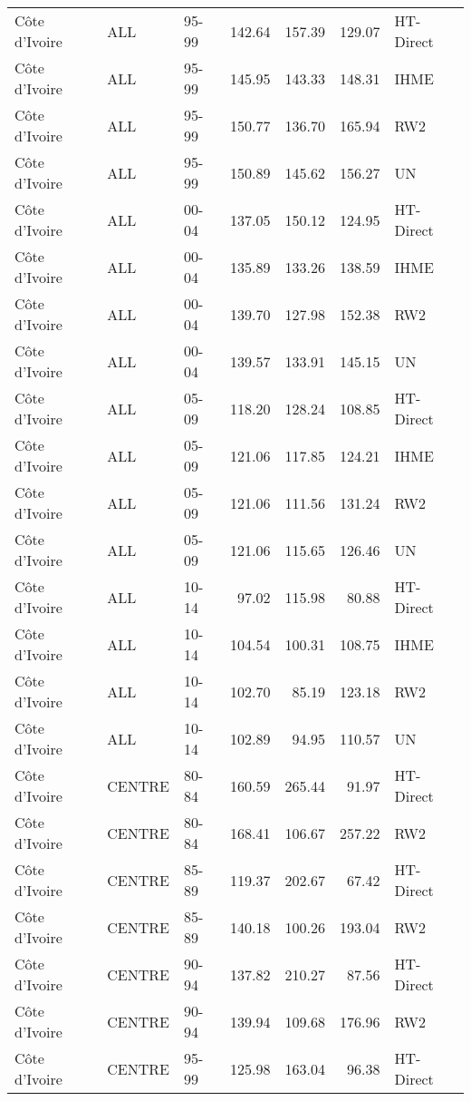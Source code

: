 \begin{longtable}{lllrrrl}
  C\^{o}te d'Ivoire & ALL & 95-99 & 142.64 & 157.39 & 129.07 & HT-Direct \\ 
  C\^{o}te d'Ivoire & ALL & 95-99 & 145.95 & 143.33 & 148.31 & IHME \\ 
  C\^{o}te d'Ivoire & ALL & 95-99 & 150.77 & 136.70 & 165.94 & RW2 \\ 
  C\^{o}te d'Ivoire & ALL & 95-99 & 150.89 & 145.62 & 156.27 & UN \\ 
  C\^{o}te d'Ivoire & ALL & 00-04 & 137.05 & 150.12 & 124.95 & HT-Direct \\ 
  C\^{o}te d'Ivoire & ALL & 00-04 & 135.89 & 133.26 & 138.59 & IHME \\ 
  C\^{o}te d'Ivoire & ALL & 00-04 & 139.70 & 127.98 & 152.38 & RW2 \\ 
  C\^{o}te d'Ivoire & ALL & 00-04 & 139.57 & 133.91 & 145.15 & UN \\ 
  C\^{o}te d'Ivoire & ALL & 05-09 & 118.20 & 128.24 & 108.85 & HT-Direct \\ 
  C\^{o}te d'Ivoire & ALL & 05-09 & 121.06 & 117.85 & 124.21 & IHME \\ 
  C\^{o}te d'Ivoire & ALL & 05-09 & 121.06 & 111.56 & 131.24 & RW2 \\ 
  C\^{o}te d'Ivoire & ALL & 05-09 & 121.06 & 115.65 & 126.46 & UN \\ 
  C\^{o}te d'Ivoire & ALL & 10-14 & 97.02 & 115.98 & 80.88 & HT-Direct \\ 
  C\^{o}te d'Ivoire & ALL & 10-14 & 104.54 & 100.31 & 108.75 & IHME \\ 
  C\^{o}te d'Ivoire & ALL & 10-14 & 102.70 & 85.19 & 123.18 & RW2 \\ 
  C\^{o}te d'Ivoire & ALL & 10-14 & 102.89 & 94.95 & 110.57 & UN \\ 
  C\^{o}te d'Ivoire & CENTRE & 80-84 & 160.59 & 265.44 & 91.97 & HT-Direct \\ 
  C\^{o}te d'Ivoire & CENTRE & 80-84 & 168.41 & 106.67 & 257.22 & RW2 \\ 
  C\^{o}te d'Ivoire & CENTRE & 85-89 & 119.37 & 202.67 & 67.42 & HT-Direct \\ 
  C\^{o}te d'Ivoire & CENTRE & 85-89 & 140.18 & 100.26 & 193.04 & RW2 \\ 
  C\^{o}te d'Ivoire & CENTRE & 90-94 & 137.82 & 210.27 & 87.56 & HT-Direct \\ 
  C\^{o}te d'Ivoire & CENTRE & 90-94 & 139.94 & 109.68 & 176.96 & RW2 \\ 
  C\^{o}te d'Ivoire & CENTRE & 95-99 & 125.98 & 163.04 & 96.38 & HT-Direct \\ 

\end{longtable}
